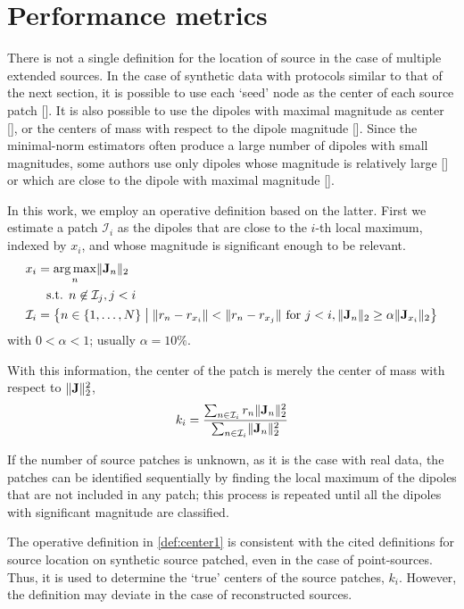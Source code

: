 
\section{Performance metrics}

There is not a single definition for the location of source in the case of  multiple extended sources.
%
In the case of synthetic data with protocols similar to that of the next section, it is possible to use each `seed' node as the center of each source patch [].
%
It is also possible to use the dipoles with maximal magnitude as center [], or the centers of mass with respect to the dipole magnitude [].
%
Since the minimal-norm estimators often produce a large number of dipoles with small magnitudes, some authors use only dipoles whose magnitude is relatively large [] or which are close to the dipole with maximal magnitude [].

In this work, we employ an operative definition based on the latter.
%
First we estimate a patch $\mathcal{I}_i$ as the dipoles that are close to the $i$-th local maximum, indexed by $x_i$, and whose magnitude is significant enough to be relevant.
\begin{align}
x_i &= \operatorname*{arg\,max}_{n} \lVert \mathbf{J}_n \rVert_2
\nonumber \\
&\phantom{=} \text{s.t. }
n\not\in \mathcal{I}_j, j<i
\\
\mathcal{I}_i
&=
\left\{  n\in \left\{ 1, \dots, N \right\} \;\middle|\; 
\lVert r_n - r_{x_i} \rVert < \lVert r_n - r_{x_j} \rVert \text{ for } j<i,
\lVert \mathbf{J}_n \rVert_2\geq \alpha\lVert \mathbf{J}_{x_i} \rVert_2  \right\}
\end{align}
with $0<\alpha<1$; usually $\alpha=10\%$.

With this information, the center of the patch is merely the center of mass with respect to $\lVert \mathbf{J} \rVert_2^2$,
\begin{align}
k_i = 
\frac{\sum_{n\in \mathcal{I}_i} r_n \lVert \mathbf{J}_n \rVert_2^2 }{\sum_{n\in \mathcal{I}_i} \lVert \mathbf{J}_n \rVert_2^2}
\label{def:center1}
\end{align}

If the number of source patches is unknown, as it is the case with real data, the patches can be identified sequentially by finding the local maximum of the dipoles that are not included in any patch; this process is repeated until all the dipoles with significant magnitude are classified.

The operative definition in \eqref{def:center1} is consistent with the cited definitions for source location on synthetic source patched, even in the case of point-sources.
%
Thus, it is used to determine the `true' centers of the source patches, $k_i$.
%
However, the definition may deviate in the case of reconstructed sources.

